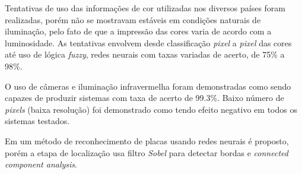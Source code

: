 Tentativas de uso das informações de cor utilizadas nos diversos
países foram realizadas, porém não se mostravam estáveis em condições
naturais de iluminação, pelo fato de que a impressão das cores varia de
acordo com a luminosidade. As tentativas envolvem desde classificação
\emph{pixel} a \emph{pixel} das cores até uso de lógica \emph{fuzzy}, redes
neurais com taxas variadas de acerto, de 75\% a 98\%.

O uso de câmeras e iluminação infravermelha foram demonstradas
como sendo capazes de produzir sistemas com taxa de acerto de 99.3\%.
Baixo número de \emph{pixels} (baixa resolução) foi demonstrado como tendo
efeito negativo em todos os sistemas testados.

Em  um método de reconhecimento de placas usando
redes neurais é proposto, porém a etapa de localização usa filtro \emph{Sobel}
para detectar bordas e \emph{connected component analysis}.

